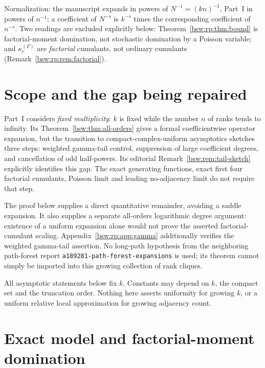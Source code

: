 \documentclass[11pt,letterpaper]{article}
\theoremstyle{definition}
\theoremstyle{remark}
\begin{document}
Normalization: the manuscript expands in powers of $N^{-1}=(kn)^{-1}$,
Part~I in powers of $n^{-1}$; a coefficient of $N^{-s}$ is $k^{-s}$ times
the corresponding coefficient of $n^{-s}$.  Two readings are excluded
explicitly below: Theorem~\ref{bsw:rp:thm:bound} is factorial-moment
domination, not stochastic domination by a Poisson variable; and
$\kappa_r^{(F)}$ are \emph{factorial} cumulants, not ordinary cumulants
(Remark~\ref{bsw:rp:rem:factorial}).

\section{Scope and the gap being repaired}\label{bsw:rp:sec:scope}

Part~I considers \emph{fixed multiplicity}: $k$ is fixed while the number
$n$ of ranks tends to infinity.  Its Theorem~\ref{bsw:thm:all-orders} gives
a formal coefficientwise operator expansion, but the transition to
compact-complex-uniform asymptotics sketches three steps: weighted
gamma-tail control, suppression of large coefficient degrees, and
cancellation of odd half-powers.  Its editorial
Remark~\ref{bsw:rem:tail-sketch} explicitly identifies this gap.  The exact
generating functions, exact first four factorial cumulants, Poisson limit
and leading no-adjacency limit do not require that step.

The proof below supplies a direct quantitative remainder, avoiding a saddle
expansion.  It also supplies a separate all-orders logarithmic degree
argument: existence of a uniform expansion alone would not prove the
asserted factorial-cumulant scaling.  Appendix~\ref{bsw:rp:app:gamma}
additionally verifies the weighted gamma-tail assertion.  No long-path
hypothesis from the neighboring path-forest report
\texttt{a189281-path-forest-expansions} is used; its theorem cannot simply
be imported into this growing collection of rank cliques.

All asymptotic statements below fix $k$.  Constants may depend on $k$, the
compact set and the truncation order.  Nothing here asserts uniformity for
growing $k$, or a uniform relative local approximation for growing
adjacency count.

\section{Exact model and factorial-moment domination}\label{bsw:rp:sec:model}
\end{document}
